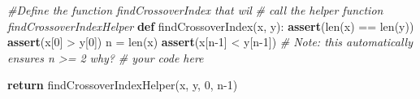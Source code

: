\documentclass[
]{article}
\newenvironment{Shaded}{}{}
\newcommand{\BuiltInTok}[1]{\textcolor[rgb]{0.00,0.50,0.00}{#1}}
\newcommand{\CommentTok}[1]{\textcolor[rgb]{0.38,0.63,0.69}{\textit{#1}}}
\newcommand{\ControlFlowTok}[1]{\textcolor[rgb]{0.00,0.44,0.13}{\textbf{#1}}}
\newcommand{\DecValTok}[1]{\textcolor[rgb]{0.25,0.63,0.44}{#1}}
\newcommand{\KeywordTok}[1]{\textcolor[rgb]{0.00,0.44,0.13}{\textbf{#1}}}
\newcommand{\NormalTok}[1]{#1}
\newcommand{\OperatorTok}[1]{\textcolor[rgb]{0.40,0.40,0.40}{#1}}
\begin{document}
\begin{Shaded}
\begin{Highlighting}[]
\CommentTok{\#Define the function findCrossoverIndex that wil }
\CommentTok{\# call the helper function findCrossoverIndexHelper}
\KeywordTok{def}\NormalTok{ findCrossoverIndex(x, y):}
    \ControlFlowTok{assert}\NormalTok{(}\BuiltInTok{len}\NormalTok{(x) }\OperatorTok{==} \BuiltInTok{len}\NormalTok{(y))}
    \ControlFlowTok{assert}\NormalTok{(x[}\DecValTok{0}\NormalTok{] }\OperatorTok{\textgreater{}}\NormalTok{ y[}\DecValTok{0}\NormalTok{])}
\NormalTok{    n }\OperatorTok{=} \BuiltInTok{len}\NormalTok{(x)}
    \ControlFlowTok{assert}\NormalTok{(x[n}\OperatorTok{{-}}\DecValTok{1}\NormalTok{] }\OperatorTok{\textless{}}\NormalTok{ y[n}\OperatorTok{{-}}\DecValTok{1}\NormalTok{]) }\CommentTok{\# Note: this automatically ensures n \textgreater{}= 2 why?}
    \CommentTok{\# your code here}
    
    
    \ControlFlowTok{return}\NormalTok{ findCrossoverIndexHelper(x, y, }\DecValTok{0}\NormalTok{, n}\OperatorTok{{-}}\DecValTok{1}\NormalTok{)}
                
        
\end{Highlighting}
\end{Shaded}
\end{document}
